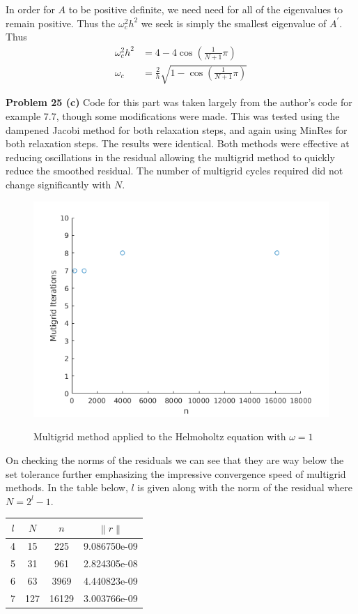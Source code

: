 \documentclass[12pt]{article}
\newcommand{\problem}[1]{\hspace{-4 ex} \large \textbf{Problem #1} }
\newcommand{\norm}[1]{\left\lVert#1\right\rVert}
\begin{document}
In order for $A$ to be positive definite, we need need for all of the eigenvalues to remain positive. Thus the $\omega_c^2h^2$ we seek is simply the smallest eigenvalue of $A^\prime$. Thus
\begin{align*}
	\omega_c^2h^2 & = 4 - 4 \cos\left(\frac{1 }{N+1}\pi \right) \\
	\omega_c & = \frac{2}{h} \sqrt{1- \cos\left(\frac{1 }{N+1}\pi \right)}
\end{align*}

\bigbreak

\problem{25 (c)} Code for this part was taken largely from the author's code for example 7.7, though some modifications were made. This was tested using the dampened Jacobi method for both relaxation steps, and again using MinRes for both relaxation steps. The results were identical. Both methods were effective at reducing oscillations in the residual allowing the multigrid method to quickly reduce the smoothed residual. The number of multigrid cycles required did not change significantly with $N$.

\begin{figure}[H]
	\caption{Multigrid method applied to the Helmoholtz equation with $\omega = 1$}
	\includegraphics[width=.75\textwidth]{hwch7_figure_4_multigrid_w1_jacobi}
	\label{multigrid}
	\centering
\end{figure}

On checking the norms of the residuals we can see that they are way below the set tolerance further emphasizing the impressive convergence speed of multigrid methods. In the table below, $l$ is given along with the norm of the residual where $N = 2^l-1$.

	\begin{center}
		\begin{tabular}{|c|c|c|c|}
			\hline
			$l$ & $N$ & $n$ & $\norm{r}$\\ \hline
			4& 15 & 225 & 9.086750e-09\\ \hline
			5& 31 & 961 & 2.824305e-08\\ \hline
			6& 63 & 3969 & 4.440823e-09\\ \hline
			7& 127 & 16129 & 3.003766e-09\\ \hline
		\end{tabular}
	\end{center}
\end{document}
